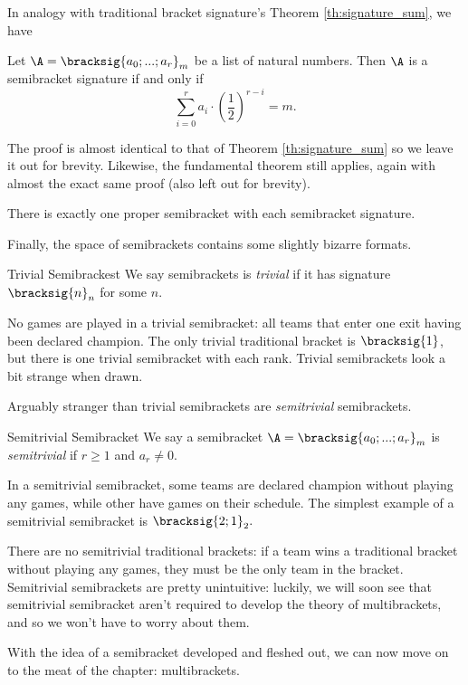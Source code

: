 {    In analogy with traditional bracket signature's Theorem \ref{th:signature_sum}, we have

    \begin{theorem}{}{}
        Let $\A = \bracksig{a_0; ...; a_r}_m$ be a list of natural numbers. Then $\A$ is a semibracket signature if and only if $$\sum_{i=0}^r a_i \cdot \left(\frac{1}{2}\right)^{r - i} = m.$$
    \end{theorem}

    The proof is almost identical to that of Theorem \ref{th:signature_sum} so we leave it out for brevity. Likewise, the fundamental theorem still applies, again with almost the exact same proof (also left out for brevity).

    \begin{theorem}{}{}
        There is exactly one proper semibracket with each semibracket signature.
    \end{theorem}

    Finally, the space of semibrackets contains some slightly bizarre formats.

    \begin{definition}{Trivial Semibrackest}{}
        We say semibrackets is \textit{trivial} if it has signature $\bracksig{n}_n$ for some $n$.
    \end{definition}

    No games are played in a trivial semibracket: all teams that enter one exit having been declared champion. The only trivial traditional bracket is $\bracksig{1}$, but there is one trivial semibracket with each rank. Trivial semibrackets look a bit strange when drawn.


    Arguably stranger than trivial semibrackets are \textit{semitrivial} semibrackets.

    \begin{definition}{Semitrivial Semibracket}{}
        We say a semibracket $\A = \bracksig{a_0; ...; a_r}_m$ is \textit{semitrivial} if $r \geq 1$ and $a_r \neq 0.$
    \end{definition}

    In a semitrivial semibracket, some teams are declared champion without playing any games, while other have games on their schedule. The simplest example of a semitrivial semibracket is $\bracksig{2;1}_2.$


    There are no semitrivial traditional brackets: if a team wins a traditional bracket without playing any games, they must be the only team in the bracket. Semitrivial semibrackets are pretty unintuitive: luckily, we will soon see that semitrivial semibracket aren't required to develop the theory of multibrackets, and so we won't have to worry about them.

    With the idea of a semibracket developed and fleshed out, we can now move on to the meat of the chapter: multibrackets.
}